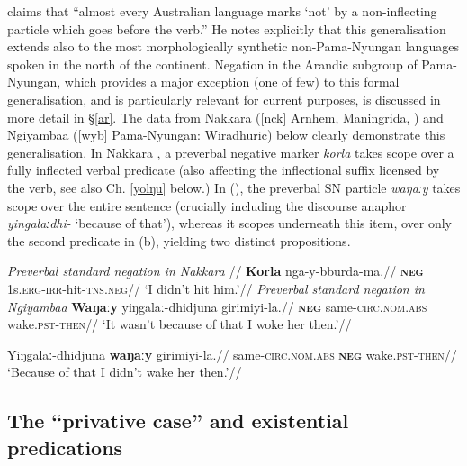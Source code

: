 \citet[82]{Dixon2002a} claims that ``almost every Australian language marks `not' by a non-inflecting particle which goes before the verb.'' He notes explicitly that this generalisation extends also to the most morphologically synthetic non-Pama-Nyungan languages spoken in the north of the continent. Negation in the Arandic subgroup of Pama-Nyungan, which provides a major exception (one of few) to this formal generalisation, and is particularly relevant for current purposes, is discussed in more detail in §\ref{ar}. The data from Nakkara ([\gls{nck}] Arnhem, Maningrida, \citealt[191]{Eather2011}) and Ngiyambaa ([\gls{wyb}] Pama-Nyungan: Wiradhuric) below clearly demonstrate this generalisation. In Nakkara , a preverbal negative marker \textit{korla} takes scope over a fully inflected verbal predicate (also affecting the inflectional suffix licensed by the verb, see also Ch. \ref{yolŋu} below.)
 In (), the preverbal SN particle \textit{waŋaːy} takes scope over the entire sentence (crucially including the discourse anaphor \textit{yingalaːdhi-} `because of that'), whereas it scopes underneath this item, over only the second predicate in (b), yielding two distinct propositions. 

\pex\begingl\glpreamble \textit{Preverbal standard negation in Nakkara} //
\gla \textbf{Korla} nga-y-bburda-ma.//
\glb \textsc{\textbf{neg}} 1s.\textsc{erg}-\textsc{irr}-hit-\textsc{tns.neg}//
\glft`I didn't hit him.'//\endgl\xe
\pex{}\textit{ Preverbal standard negation in Ngiyambaa}
\a{}\begingl\gla \textbf{Waŋaːy} yiŋgalaː-dhi\textdblhyphen dju\textdblhyphen na girimiyi-la.//
\glb \textsc{\textbf{neg}} same-\textsc{circ}.\textsc{nom}.\textsc{abs} wake\textsc{.pst-then}//
\glft`It wasn't because of that I woke her then.'//\endgl

\a\label{wyb2}\begingl\gla Yiŋgalaː-dhi\textdblhyphen dju\textdblhyphen na \textbf{waŋaːy} girimiyi-la.//
\glb same-\textsc{circ}.\textsc{nom}.\textsc{abs} \textsc{\textbf{neg}} wake\textsc{.pst-then}//
\glft`Because of that I didn't wake her then.'//\endgl
\xe
\subsection{The ``privative case'' and existential predications}\label{priv-sems}

